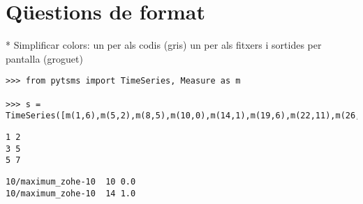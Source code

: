 \section{Qüestions de format}




* Simplificar colors: un per als codis (gris) un per als fitxers i sortides per pantalla (groguet)



\begin{lstlisting}[style=py,caption=Exemple de codi,label=lst:format:python]
>>> from pytsms import TimeSeries, Measure as m

>>> s = TimeSeries([m(1,6),m(5,2),m(8,5),m(10,0),m(14,1),m(19,6),m(22,11),m(26,6),m(29,0)])
\end{lstlisting}



\begin{lstlisting}[style=file,caption=Exemple de fitxer,label=lst:format:file]
1 2
3 5
5 7
\end{lstlisting}


\begin{lstlisting}[style=stdout,caption=Sortida per pantalla,label=lst:format:stdout]
10/maximum_zohe-10	10 0.0
10/maximum_zohe-10	14 1.0
\end{lstlisting}





